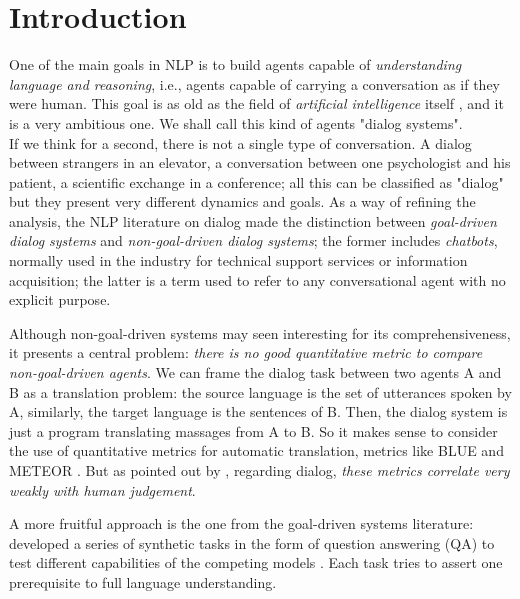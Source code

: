 \chapter{Introduction}
\label{ch:01-introduction}

One of the main goals in NLP is to build agents capable of \textit{understanding language and reasoning}, i.e., agents capable of carrying a conversation as if they were human. This goal is as old as the field of \textit{artificial intelligence} itself \cite{Turing}, and it is a very ambitious one. We shall call this kind of agents "dialog systems".\\

If we think for a second, there is not a single type of conversation. A dialog between strangers in an elevator, a conversation between one psychologist and his patient, a scientific exchange in a conference; all this can be classified as "dialog" but they present very different dynamics and goals. As a way of refining the analysis, the NLP literature on dialog made the distinction between \textit{goal-driven dialog systems} and \textit{non-goal-driven dialog systems}; the former includes \textit{chatbots}, normally used in the industry for technical support services or information acquisition; the latter is a term used to refer to any conversational agent with no explicit purpose.

Although non-goal-driven systems may seen interesting for its comprehensiveness, it presents a central problem: \textit{there is no good quantitative metric to compare non-goal-driven agents}. We can frame the dialog task between two agents A and B as a translation problem: the source language is the set of utterances spoken by A, similarly, the target language is the sentences of B. Then, the dialog system is just a program translating massages from A to B. So it makes sense to consider the use of quantitative metrics for automatic translation, metrics like BLUE \cite{Papineni02bleu:a} and METEOR \cite{Lavie:2007:MAM:1626355.1626389}. But as pointed out by \cite{LiuLSNCP16, LoweSNCP16}, regarding dialog, \textit{these metrics correlate very weakly with human judgement}.

A more fruitful approach is the one from the goal-driven systems literature: developed a series of synthetic tasks in the form of question answering (QA) to test different capabilities of the competing models \cite{BordesW16, Hixon15, WestonBCM15}. Each task tries to assert one prerequisite to full language understanding.

